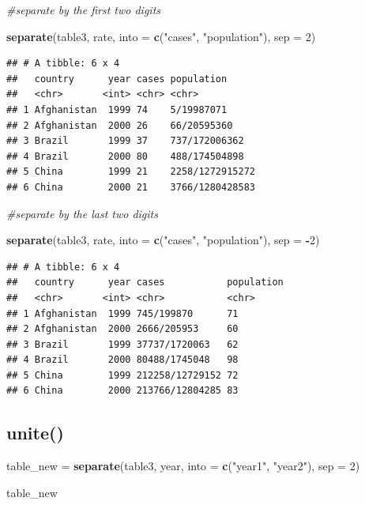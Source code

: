 \documentclass[]{book}
\newenvironment{Shaded}{\begin{snugshade}}{\end{snugshade}}
\newcommand{\KeywordTok}[1]{\textcolor[rgb]{0.13,0.29,0.53}{\textbf{#1}}}
\newcommand{\DataTypeTok}[1]{\textcolor[rgb]{0.13,0.29,0.53}{#1}}
\newcommand{\DecValTok}[1]{\textcolor[rgb]{0.00,0.00,0.81}{#1}}
\newcommand{\StringTok}[1]{\textcolor[rgb]{0.31,0.60,0.02}{#1}}
\newcommand{\CommentTok}[1]{\textcolor[rgb]{0.56,0.35,0.01}{\textit{#1}}}
\newcommand{\OperatorTok}[1]{\textcolor[rgb]{0.81,0.36,0.00}{\textbf{#1}}}
\newcommand{\NormalTok}[1]{#1}
\begin{document}
\begin{Shaded}
\begin{Highlighting}[]
\CommentTok{#separate by the first two digits}

\KeywordTok{separate}\NormalTok{(table3, rate, }\DataTypeTok{into =} \KeywordTok{c}\NormalTok{(}\StringTok{"cases"}\NormalTok{, }\StringTok{"population"}\NormalTok{), }\DataTypeTok{sep =} \DecValTok{2}\NormalTok{)}
\end{Highlighting}
\end{Shaded}

\begin{verbatim}
## # A tibble: 6 x 4
##   country      year cases population     
##   <chr>       <int> <chr> <chr>          
## 1 Afghanistan  1999 74    5/19987071     
## 2 Afghanistan  2000 26    66/20595360    
## 3 Brazil       1999 37    737/172006362  
## 4 Brazil       2000 80    488/174504898  
## 5 China        1999 21    2258/1272915272
## 6 China        2000 21    3766/1280428583
\end{verbatim}

\begin{Shaded}
\begin{Highlighting}[]
\CommentTok{#separate by the last two digits}

\KeywordTok{separate}\NormalTok{(table3, rate, }\DataTypeTok{into =} \KeywordTok{c}\NormalTok{(}\StringTok{"cases"}\NormalTok{, }\StringTok{"population"}\NormalTok{), }\DataTypeTok{sep =} \OperatorTok{-}\DecValTok{2}\NormalTok{)}
\end{Highlighting}
\end{Shaded}

\begin{verbatim}
## # A tibble: 6 x 4
##   country      year cases           population
##   <chr>       <int> <chr>           <chr>     
## 1 Afghanistan  1999 745/199870      71        
## 2 Afghanistan  2000 2666/205953     60        
## 3 Brazil       1999 37737/1720063   62        
## 4 Brazil       2000 80488/1745048   98        
## 5 China        1999 212258/12729152 72        
## 6 China        2000 213766/12804285 83
\end{verbatim}

\subsection{unite()}\label{unite}

\begin{Shaded}
\begin{Highlighting}[]
\NormalTok{table_new =}\StringTok{ }\KeywordTok{separate}\NormalTok{(table3, year, }\DataTypeTok{into =} \KeywordTok{c}\NormalTok{(}\StringTok{"year1"}\NormalTok{, }\StringTok{"year2"}\NormalTok{), }\DataTypeTok{sep =} \DecValTok{2}\NormalTok{)}

\NormalTok{table_new}
\end{Highlighting}
\end{Shaded}
\end{document}
